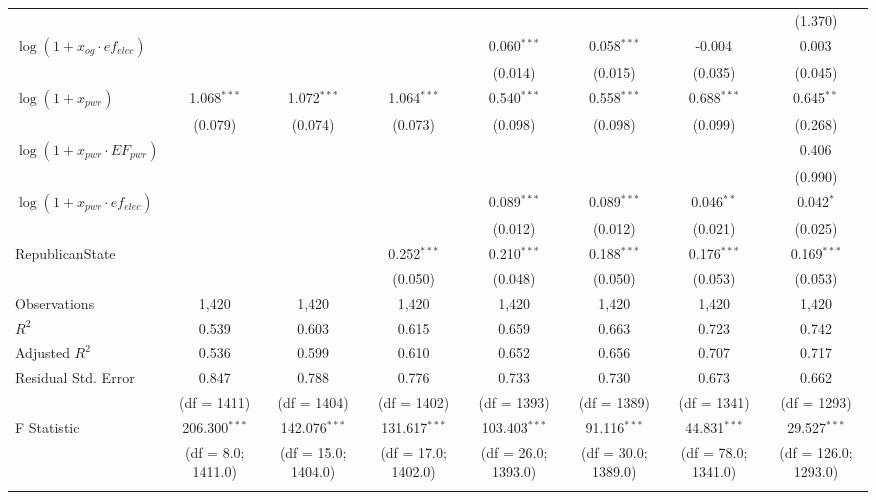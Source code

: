 \begin{longtable}[h]{lccccccc}
  & & & & & & & (1.370) \\
 $\log(1 + x_{og}\cdot ef_{elec})$ & & & & 0.060$^{***}$ & 0.058$^{***}$ & -0.004$^{}$ & 0.003$^{}$ \\
  & & & & (0.014) & (0.015) & (0.035) & (0.045) \\
 $\log(1 + x_{pwr})$ & 1.068$^{***}$ & 1.072$^{***}$ & 1.064$^{***}$ & 0.540$^{***}$ & 0.558$^{***}$ & 0.688$^{***}$ & 0.645$^{**}$ \\
  & (0.079) & (0.074) & (0.073) & (0.098) & (0.098) & (0.099) & (0.268) \\
 $\log(1 + x_{pwr}\cdot EF_{pwr})$ & & & & & & & 0.406$^{}$ \\
  & & & & & & & (0.990) \\
 $\log(1 + x_{pwr}\cdot ef_{elec})$ & & & & 0.089$^{***}$ & 0.089$^{***}$ & 0.046$^{**}$ & 0.042$^{*}$ \\
  & & & & (0.012) & (0.012) & (0.021) & (0.025) \\
 RepublicanState & & & 0.252$^{***}$ & 0.210$^{***}$ & 0.188$^{***}$ & 0.176$^{***}$ & 0.169$^{***}$ \\
  & & & (0.050) & (0.048) & (0.050) & (0.053) & (0.053) \\

\midrule
 Observations & 1,420 & 1,420 & 1,420 & 1,420 & 1,420 & 1,420 & 1,420 \\
 $R^2$ & 0.539 & 0.603 & 0.615 & 0.659 & 0.663 & 0.723 & 0.742 \\
 Adjusted $R^2$ & 0.536 & 0.599 & 0.610 & 0.652 & 0.656 & 0.707 & 0.717 \\
 Residual Std. Error & 0.847 & 0.788 & 0.776 & 0.733 & 0.730 & 0.673 & 0.662  \\
  & (df = 1411) &(df = 1404) & (df = 1402) & (df = 1393) & (df = 1389) & (df = 1341) & (df = 1293) \\
 F Statistic & 206.300$^{***}$  & 142.076$^{***}$  & 131.617$^{***}$  & 103.403$^{***}$  & 91.116$^{***}$  & 44.831$^{***}$  & 29.527$^{***}$  \\
 & (df = 8.0; 1411.0) & (df = 15.0; 1404.0) & (df = 17.0; 1402.0) & (df = 26.0; 1393.0) & (df = 30.0; 1389.0) & (df = 78.0; 1341.0) & (df = 126.0; 1293.0) \\
 \bottomrule \\


\end{longtable}